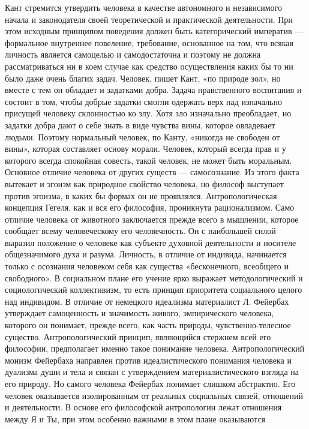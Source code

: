 \documentclass[12pt]{article}
\begin{document}
Кант  стремится  утвердить  человека  в  качестве  автономного  и  независимого  начала  и  законодателя  своей
теоретической  и  практической  деятельности.  При  этом  исходным  принципом  поведения  должен  быть
категорический императив — формальное внутреннее повеление, требование, основанное на том, что всякая
личность является самоцелью и самодостаточна и поэтому не должна рассматриваться ни в коем случае как
средство осуществления каких бы то ни было даже очень благих задач.
Человек, пишет Кант, «по природе зол», но вместе с тем он обладает и задатками добра. Задача нравственного
воспитания и состоит в том, чтобы добрые задатки смогли одержать верх над изначально присущей человеку
склонностью ко злу. Хотя зло изначально преобладает, но задатки добра дают о себе знать в виде чувства вины,
которое овладевает людьми. Поэтому нормальный человек, по Канту, «никогда не свободен от вины», которая
составляет основу морали. Человек, который всегда прав и у которого всегда спокойная совесть, такой человек,
не может быть моральным. Основное отличие человека от других существ — самосознание. Из этого факта
вытекает и эгоизм как природное свойство человека, но философ выступает против эгоизма, в каких бы формах
он не проявлялся.
Антропологическая концепция Гегеля, как и вся его философия, проникнута рационализмом. Само отличие
человека от животного заключается прежде всего в мышлении, которое сообщает всему человеческому его
человечность. Он с наибольшей силой выразил положение о человеке как субъекте духовной деятельности и
носителе общезначимого духа и разума. Личность, в отличие от индивида, начинается только с осознания
человеком себя как существа «бесконечного, всеобщего и свободного». В социальном плане его учение ярко
выражает методологический и социологический коллективизм, то есть принцип приоритета социального целого
над  индивидом.  В  отличие  от  немецкого  идеализма  материалист  Л.  Фейербах  утверждает  самоценность  и
значимость  живого,  эмпирического  человека,  которого  он  понимает,  прежде  всего,  как  часть  природы,
чувственно-телесное  существо.  Антропологический  принцип,  являющийся  стержнем  всей  его  философии,
предполагает  именно  такое понимание человека.  Антропологический монизм  Фейербаха направлен  против
идеалистического понимания человека и дуализма души и тела и связан с утверждением материалистического
взгляда на его природу. Но самого человека Фейербах понимает слишком абстрактно. Его человек оказывается
изолированным  от  реальных  социальных  связей,  отношений  и  деятельности.  В  основе  его  философской
антропологии  лежат  отношения  между  Я  и  Ты,  при  этом  особенно  важными  в  этом  плане  оказываются
\end{document}

